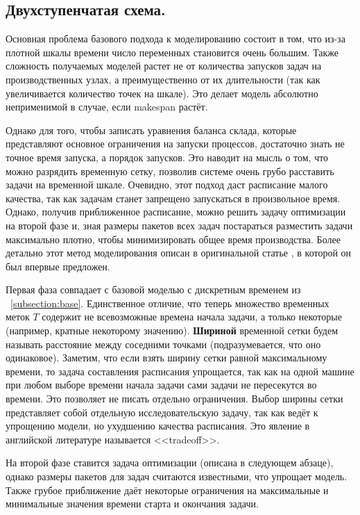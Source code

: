 \documentclass[12pt, twoside]{article}
\theoremstyle{definition}
\begin{document}
\subsection{Двухступенчатая схема.}
\label{subsection:heuristic}

Основная проблема базового подхода к моделированию состоит в том, что из-за плотной шкалы времени число переменных становится очень большим. Также сложность получаемых моделей растет не от количества запусков задач на производственных узлах, а преимущественно от их длительности (так как увеличивается количество точек на шкале). Это делает модель абсолютно неприменимой в случае, если makespan растёт.

Однако для того, чтобы записать уравнения баланса склада, которые представляют основное ограничения на запуски процессов, достаточно знать не точное время запуска, а порядок запусков. Это наводит на мысль о том, что можно разрядить временную сетку, позволив системе очень грубо расставить задачи на временной шкале. Очевидно, этот подход даст расписание малого качества, так как задачам станет запрещено запускаться в произвольное время. Однако, получив приближенное расписание, можно решить задачу оптимизации на второй фазе и, зная размеры пакетов всех задач постараться разместить задачи максимально плотно, чтобы минимизировать общее время производства. Более детально этот метод моделирования описан в оригинальной статье \cite{lpheuristic}, в которой он был впервые предложен.

Первая фаза совпадает с базовой моделью с дискретным временем из ~\ref{subsection:base}. Единственное отличие, что теперь множество временных меток $T$ содержит не всевозможные времена начала задачи, а только некоторые (например, кратные некоторому значению). \textbf{Шириной} временной сетки будем называть расстояние между соседними точками (подразумевается, что оно одинаковое). Заметим, что если взять ширину сетки равной максимальному времени, то задача составления расписания упрощается, так как на одной машине при любом выборе времени начала задачи сами задачи не пересекутся во времени. Это позволяет не писать отдельно ограничения. Выбор ширины сетки представляет собой отдельную исследовательскую задачу, так как ведёт к упрощению модели, но ухудшению качества расписания. Это явление в английской литературе называется <<tradeoff>>.

На второй фазе ставится задача оптимизации (описана в следующем абзаце), однако размеры пакетов для задач считаются известными, что упрощает модель. Также грубое приближение даёт некоторые ограничения на максимальные и минимальные значения времени старта и окончания задачи.
\end{document}
